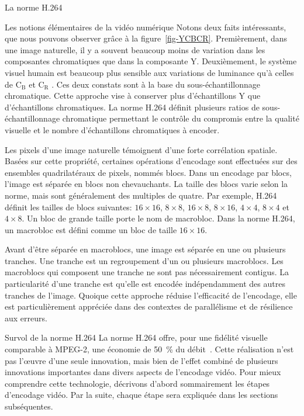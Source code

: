 \documentclass[letterpaper, twoside, 12pt,memoire]{thETS}
\newcommand{\fig}[1]{figure~\ref{#1}}
\begin{document}
\begin{chapter}{La norme H.264}
\begin{section}{Les notions élémentaires de la vidéo numérique}
Notons deux faits intéressants, que nous pouvons observer grâce à la
\fig{fig-YCBCR}. Premièrement, dans une image naturelle, il y a souvent beaucoup
moins de variation dans les composantes chromatiques que dans la composante Y.
Deuxièmement, le système visuel humain est beaucoup plus sensible aux variations
de luminance qu'à celles de C$_{\text{B}}$ et C$_{\text{R}}$ \citep{Wang2001}.
Ces deux constats sont à la base du sous-échantillonnage chromatique. Cette
approche vise à conserver plus d'échantillons Y que d'échantillons chromatiques.
La norme H.264 définit plusieurs ratios de sous-échantillonnage chromatique
permettant le contrôle du compromis entre la qualité visuelle et le nombre
d'échantillons chromatiques à encoder.

Les pixels d'une image naturelle témoignent d'une forte corrélation spatiale.
Basées sur cette propriété, certaines opérations d'encodage sont effectuées sur
des ensembles quadrilatéraux de pixels, nommés blocs. Dans un encodage par
blocs, l'image est séparée en blocs non chevauchants. La taille des blocs varie
selon la norme, mais sont généralement des multiples de quatre. Par exemple,
H.264 définit les tailles de blocs suivantes: $16 \times 16$, $8 \times 8$, $16
\times 8$, $8 \times 16$, $4 \times 4$, $8 \times 4$ et $4 \times 8$. Un bloc de
grande taille porte le nom de macrobloc. Dans la norme H.264, un macrobloc est
défini comme un bloc de taille $16 \times 16$.

Avant d'être séparée en macroblocs, une image est séparée en une ou plusieurs
tranches. Une tranche est un regroupement d'un ou plusieurs macroblocs. Les
macroblocs qui composent une tranche ne sont pas nécessairement contigus. La
particularité d'une tranche est qu'elle est encodée indépendamment des autres
tranches de l'image. Quoique cette approche réduise l'efficacité de l'encodage,
elle est particulièrement appréciée dans des contextes de parallélisme et de
résilience aux erreurs.
\end{section}

\begin{section}{Survol de la norme H.264}
La norme H.264 offre, pour une fidélité visuelle comparable à MPEG-2, une
économie de 50~\% du débit~\citep{sullivan2005}. Cette réalisation n'est
pas l'œuvre d'une seule innovation, mais bien de l'effet combiné de plusieurs
innovations importantes dans divers aspects de l'encodage vidéo. Pour mieux
comprendre cette technologie, décrivons d'abord sommairement les étapes
d'encodage vidéo. Par la suite, chaque étape sera expliquée dans les
sections subséquentes.


\end{section}
\end{chapter}
\end{document}

